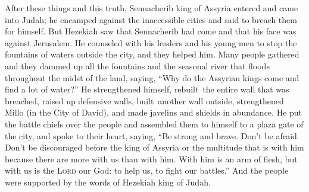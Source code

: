 
\begin{inparaenum}
   After these things and this truth, Sennacherib king of Assyria entered and came into Judah; he encamped against the inaccessible cities and said to breach them for himself.%
   But Hezekiah saw that Sennacherib had come and that his face was against Jerusalem.%
   He counseled with his leaders and his young men to stop the fountains of waters outside the city, and they helped him.%
   Many people gathered and they dammed up all the fountains and the seasonal river that floods throughout the midst of the land, saying, ``Why do the Assyrian kings come and find a lot of water?''%
   He strengthened himself, rebuilt\thinspace\understood\ the entire wall that was breached, raised up defensive walls, built\understood\ another wall outside, strengthened Millo (in the City of David), and made javelins and shields in abundance.%
   He put the battle chiefs over the people and assembled them to himself to a plaza gate of the city, and spoke to their heart, saying,%
   ``Be strong and brave. Don't be afraid. Don't be discouraged before the king of Assyria or the multitude that is with him because there are more with us than with him.%
   With him is an arm of flesh, but with us is the \textsc{Lord} our God: to help us, to fight our battles.'' And the people were supported by the words of Hezekiah king of Judah.%
  

\end{inparaenum}

